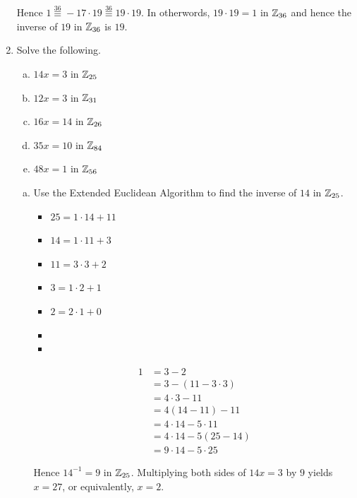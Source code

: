 \documentclass[11pt,fleqn,dvipsnames,usenames]{article}
\begin{document}
\begin{enumerate}
Hence $1\overset{36}{\equiv} -17\cdot 19\overset{36}{\equiv} 19\cdot 19$.  In otherwords, $19\cdot 19 = 1$ in $\mathbb{Z}_{36}$ and hence the inverse of $19$ in $\mathbb{Z}_{36}$ is $19$.

\item Solve the following.
\begin{enumerate}[(a)]
\item $14x = 3$ in $\mathbb{Z}_{25}$
\item $12x = 3$ in $\mathbb{Z}_{31}$
\item $16x = 14$ in $\mathbb{Z}_{26}$
\item $35x = 10$ in $\mathbb{Z}_{84}$
\item $48x = 1$ in $\mathbb{Z}_{56}$
\end{enumerate}
\vsmsp

\solution
\begin{enumerate}[(a)]
\item Use the Extended Euclidean Algorithm to find the inverse of $14$ in $\mathbb{Z}_{25}$.
\begin{multicols}{2}
\begin{itemize}[\ ]
\item $25 = 1\cdot 14 + 11$
\item $14 = 1\cdot 11 + 3$
\item $11 = 3\cdot 3 + 2$
\item $3 = 1\cdot 2 + 1$
\item $2 = 2\cdot 1 + 0$
\item
\item
\end{itemize}
\columnbreak
\begin{align*}
1 &= 3 - 2\\
&= 3 - (11 - 3\cdot 3)\\
&= 4\cdot 3 - 11\\
&= 4(14 - 11) - 11\\
&= 4\cdot 14 - 5\cdot 11\\
&= 4\cdot 14 - 5(25 - 14)\\
&= 9\cdot 14 - 5\cdot 25
\end{align*}
\end{multicols}
Hence $14^{-1} = 9$ in $\mathbb{Z}_{25}$.  Multiplying both sides of $14x=3$ by $9$ yields $x=27$, or equivalently, $x=2$.
\end{enumerate}
\end{enumerate}
\end{document}
